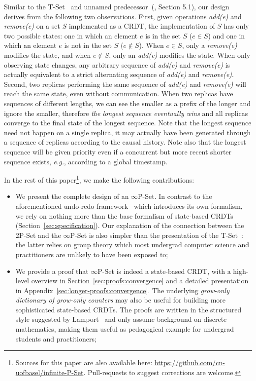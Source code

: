 \documentclass[9pt, oneside]{article}   	%
\begin{document}
Similar to the T-Set~\cite{Dolan2020undoable} and unnamed predecessor~(\cite{Yu2019undo}, Section 5.1), our design derives from the following two observations. First, given operations \textit{add(e)} and \textit{remove(e)} on a set $S$ implemented as a CRDT, the implementation of $S$ has only two possible states: one in which an element $e$ is in the set $S$ ($e \in S$) and one in which an element $e$ is not in the set $S$ ($e \notin S$). When $e \in S$, only a \textit{remove(e)} modifies the state, and when $e \notin S$, only an \textit{add(e)} modifies the state. When only observing state changes, any arbitrary sequence of \textit{add(e)} and \textit{remove(e)} is actually equivalent to a strict alternating sequence of \textit{add(e)} and \textit{remove(e)}. Second, two replicas performing the same sequence of \textit{add(e)} and \textit{remove(e)} will reach the same state, even without communication. When two replicas have sequences of different lengths, we can see the smaller as a prefix of the longer and ignore the smaller, therefore \textit{the longest sequence eventually wins} and all replicas converge to the final state of the longest sequence. Note that the longest sequence need not happen on a single replica, it may actually have been generated through a sequence of replicas according to the causal history. Note also that the longest sequence will be given priority even if a concurrent but more recent shorter sequence exists, \textit{e.g.}, according to a global timestamp.  

In the rest of this paper\footnote{Sources for this paper are also available here: \url{https://github.com/cn-uofbasel/infinite-P-Set}. Pull-requests to suggest corrections are welcome.}, we make the following contributions:
\begin{itemize}
	\item We present the complete design of an $\infty$P-Set. In contrast to the aforementioned undo-redo framework~\cite{Yu2019undo} which introduces its own formalism, we rely on nothing more than the base formalism of state-based CRDTs (Section~\ref{sec:specification}). Our explanation of the connection between the 2P-Set and the $\infty$P-Set is also simpler than the presentation of the T-Set~\cite{Dolan2020undoable}: the latter relies on group theory which most undergrad computer science and practitioners are unlikely to have been exposed to;
	\item We provide a proof that $\infty$P-Set is indeed a state-based CRDT, with a high-level overview in Section~\ref{sec:proofs:convergence} and a detailed presentation in Appendix~\ref{sec:longer-proofs:convergence}. The underlying \textit{grow-only dictionary of grow-only counters} may also be useful for building more sophisticated state-based CRDTs. The proofs are written in the structured style suggested by Lamport~\cite{lamport2012write} and only assume background on discrete mathematics, making them useful as pedagogical example for undergrad students and practitioners;
\end{itemize}
\end{document}
